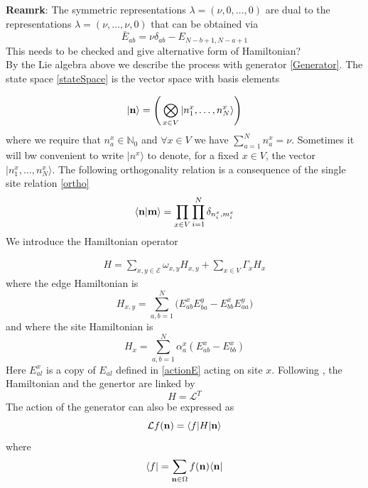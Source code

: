 \documentclass[11pt]{article}
\numberwithin{equation}{section}
\numberwithin{equation}{subsection}
\newcommand{\twoj}{\nu}
\begin{document}
\noindent
\textbf{Reamrk}: The symmetric representations $\lambda=(\twoj,0,\ldots,0)$ are dual to the representations $\lambda=(\twoj,\ldots,\twoj,0)$ that can be obtained via 
\begin{equation}
   \bar E_{ab}=\nu\delta_{ab}-E_{N-b+1,N-a+1}
\end{equation}
{\color{red} This needs to be checked and give alternative form of Hamiltonian?}\\
By the Lie algebra above we describe the process with generator \eqref{Generator}. The state space \eqref{stateSpace} is the vector space with basis elements 

\begin{equation}
|{\bf n}\rangle=\left(\,\bigotimes_{x\in V}	|n_{1}^{x},\ldots,n_{N}^{x}\rangle\right)
\end{equation}
where we require that $n_{a}^{x}\in \mathbb{N}_{0}$ and $\forall x\in V$ we have $\sum_{a=1}^{N}n_{a}^{x}=\nu$. Sometimes it will bw convenient to write $|n^{x}\rangle$ to denote, for a fixed $x\in V$, the vector $|n_{1}^{x},\ldots,n_{N}^{x}\rangle$. The following orthogonality relation is a consequence of the single site relation \eqref{ortho}
\begin{equation}
    \langle {\bf n}|{\bf m}\rangle =\prod_{x\in V}\prod_{i=1}^N\delta_{n^x_i,m^{x}_i}
\end{equation}
We introduce the Hamiltonian operator

\begin{equation}\label{OriginalHamiltonian}
	\begin{split}
		H=\sum_{x,y\in \mathcal{E}}\omega_{x,y}H_{x,y}+\sum_{x\in V}\Gamma_{x}H_{x}
	\end{split}
\end{equation}
where the edge Hamiltonian is
\begin{equation}\label{edgeHamiltonian}
H_{x,y}=\sum_{a,b=1}^{N}\Big(E_{ab}^{x} E_{b a}^{y}-E_{bb}^{x} E_{aa}^{y}\Big)
 \end{equation}
  and where the site Hamiltonian is
 \begin{equation}\label{siteHamiltonian}
H_{x}=\sum_{a,b=1}^{N}\alpha_{a}^{x}\left(E_{ab}^{x}-E_{bb}^{x}\right)
\end{equation}
Here $E_{al}^{x}$ is a copy of $E_{al}$ defined in \eqref{actionE} acting on site $x$. 
Following  \cite{belitsky2015self}, the Hamiltonian and the genertor are linked by
\begin{equation}\label{Hamiltonian-Generator}
H=\mathcal{L}^{T}
\end{equation}
The action of the generator can also be expressed as 
\begin{equation}
    \mathcal{L}f( {\bf n})=\langle f|H| {\bf n}\rangle
\end{equation}
where 
\begin{equation}
    \langle f|=\sum_{ {{\bf n}\in \Omega}}f( {\bf n})\langle  {\bf n}|
\end{equation}
\end{document}
